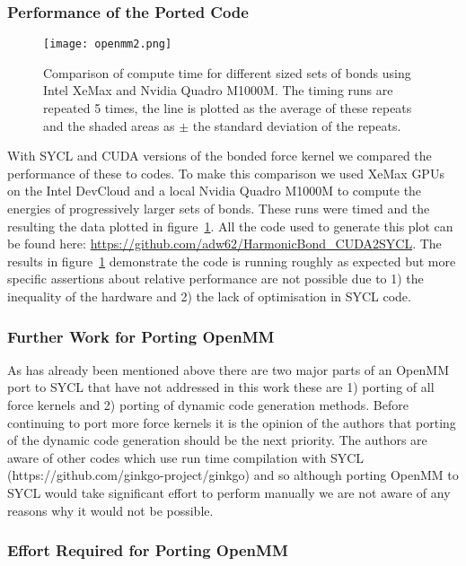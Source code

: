 \documentclass[../main]{subfiles}
\begin{document}
\subsubsection{Performance of the Ported Code}\label{sec:openmm_performance}

\begin{figure}
	\caption{Comparison of compute time for different sized sets of bonds using Intel XeMax and Nvidia Quadro M1000M. The timing runs are repeated 5 times, the line is plotted as the average of these repeats and the shaded areas as $\pm$ the standard deviation of the repeats.}
	\texttt{[image: openmm2.png]}
	\label{fig:openmm}
\end{figure}

With SYCL and CUDA versions of the bonded force kernel we compared the performance of these to codes.
To make this comparison we used XeMax GPUs on the Intel DevCloud and a local Nvidia Quadro M1000M to compute the energies of progressively larger sets of bonds.
These runs were timed and the resulting the data plotted in figure~\ref{fig:openmm}.
All the code used to generate this plot can be found here: \url{https://github.com/adw62/HarmonicBond_CUDA2SYCL}. The results in figure~\ref{fig:openmm} demonstrate the code is running roughly as expected but more specific assertions about relative performance are not possible due to 1) the inequality of the hardware and 2) the lack of optimisation in SYCL code.

\subsubsection{Further Work for Porting OpenMM}\label{sec:openmm_furtherwork}

As has already been mentioned above there are two major parts of an OpenMM port to SYCL that have not addressed in this work these are 1) porting of all force kernels and 2) porting of dynamic code generation methods.
Before continuing to port more force kernels it is the opinion of the authors that porting of the dynamic code generation should be the next priority. The authors are aware of other codes which use run time compilation with SYCL (https://github.com/ginkgo-project/ginkgo) and so although porting OpenMM to SYCL would take significant effort to perform manually we are not aware of any reasons why it would not be possible.


\subsubsection{Effort Required for Porting OpenMM}\label{sec:openmm_effort}
\end{document}
